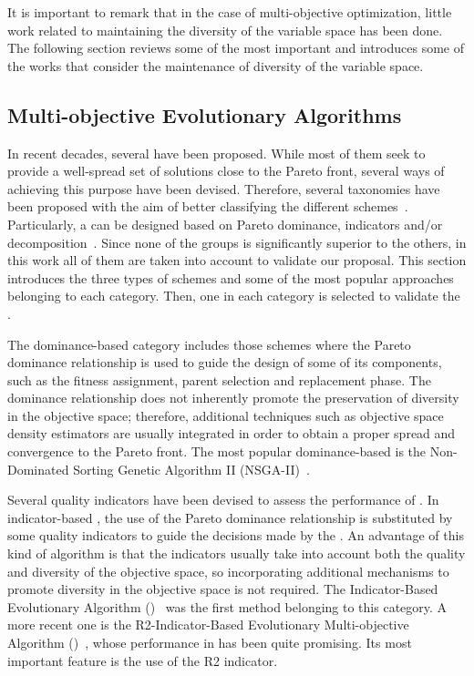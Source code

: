 It is important to remark that in the case of multi-objective optimization, little work related to maintaining the 
diversity of the variable space has been done.
%
The following section reviews some of the most important \MOEAS{} and introduces some of the works that consider
the maintenance of diversity of the variable space.

\subsection{Multi-objective Evolutionary Algorithms}

In recent decades, several \MOEAS{} have been proposed. 
%
While most of them seek to provide a well-spread set of solutions close to the Pareto front,
several ways of achieving this purpose have been devised.
%
Therefore, several taxonomies have been proposed with the aim of better classifying the different 
schemes~\cite{Joel:BOOK_MOEAs}.
%
Particularly, a \MOEA{} can be designed based on Pareto dominance, indicators and/or decomposition~\cite{Joel:StateArt}.
%
Since none of the groups is significantly superior to the others, in this work all of them are taken into account to validate
our proposal.
%
This section introduces the three types of schemes and some of the most popular approaches belonging to each category.
%
Then, one \MOEA{} in each category is selected to validate the \VSDMOEA{}.

The dominance-based category includes those schemes where the Pareto dominance relationship is used to guide the 
design of some of its components, such as the fitness assignment, parent selection and replacement phase.
%
The dominance relationship does not inherently promote the preservation of diversity in the objective space; 
therefore, additional techniques such as objective space density estimators are usually integrated in order to obtain a proper spread and convergence to the Pareto front.
%
The most popular dominance-based \MOEA{} is the Non-Dominated Sorting Genetic Algorithm II (NSGA-II)~\cite{Joel:NSGAII}.
%

Several quality indicators have been devised to assess the performance of \MOEAS{}.
%
In indicator-based \MOEAS{}, the use of the Pareto dominance relationship is substituted by some quality indicators 
to guide the decisions made by the \MOEA{}.
%
An advantage of this kind of algorithm is that the indicators usually take into account both the quality and 
diversity of the objective space, so incorporating additional mechanisms to promote diversity in the objective 
space is not required.
%
The Indicator-Based Evolutionary Algorithm (\IBEA{})~\cite{Joel:IBEA} was the first method belonging to this category.
%
A more recent one is the R2-Indicator-Based Evolutionary Multi-objective Algorithm (\RMOEA{})~\cite{trautmann2013r2}, 
whose performance in \MOPS{} has been quite promising.
%
Its most important feature is the use of the R2 indicator.

